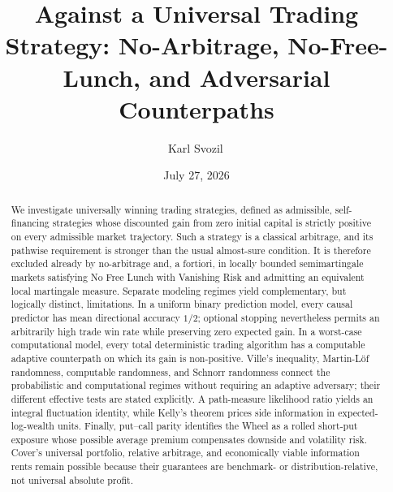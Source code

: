 \documentclass[aps,pra,reprint,superscriptaddress,amsmath,amssymb,floatfix]{revtex4-2}
\theoremstyle{plain}
\theoremstyle{definition}
\theoremstyle{remark}
\begin{document}
\title{Against a Universal Trading Strategy: No-Arbitrage, No-Free-Lunch, and Adversarial Counterpaths}

\author{Karl Svozil\,}

\date{July 27, 2026}

\begin{abstract}
We investigate universally winning trading strategies, defined as admissible,
self-financing strategies whose discounted gain from zero initial capital is
strictly positive on every admissible market trajectory. Such a strategy is a
classical arbitrage, and its pathwise requirement is stronger than the usual
almost-sure condition. It is therefore excluded already by no-arbitrage and,
a fortiori, in locally bounded semimartingale markets satisfying No Free Lunch
with Vanishing Risk and admitting an equivalent local martingale measure.
Separate modeling regimes yield complementary, but logically distinct,
limitations. In a uniform binary prediction model, every causal predictor has
mean directional accuracy \(1/2\); optional stopping nevertheless permits an
arbitrarily high trade win rate while preserving zero expected gain. In a
worst-case computational model, every total deterministic trading algorithm
has a computable adaptive counterpath on which its gain is non-positive.
Ville's inequality, Martin-L\"of randomness, computable randomness, and
Schnorr randomness connect the probabilistic and computational regimes
without requiring an adaptive adversary; their different effective tests are
stated explicitly. A path-measure likelihood ratio yields an integral
fluctuation identity, while Kelly's theorem prices side information in
expected-log-wealth units. Finally, put--call parity identifies the Wheel as a
rolled short-put exposure whose possible average premium compensates
downside and volatility risk. Cover's universal portfolio, relative
arbitrage, and economically viable information rents remain possible because
their guarantees are benchmark- or distribution-relative, not universal
absolute profit.
\end{abstract}

\maketitle

\end{document}
